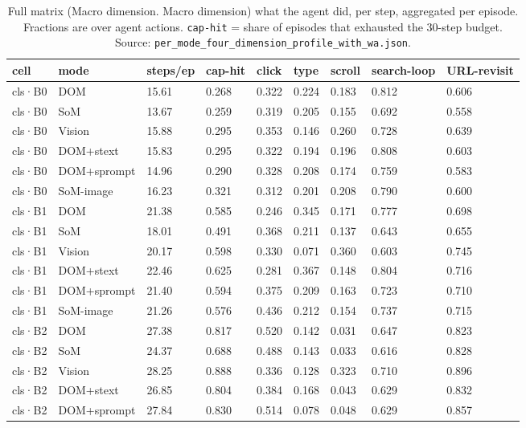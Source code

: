 \begin{table}[tp]
\centering
\caption{Full matrix (Macro dimension. Macro dimension) what the agent did, per step, aggregated per episode. Fractions are over agent actions. \texttt{cap-hit} = share of episodes that exhausted the 30-step budget. Source: \texttt{per\_mode\_four\_dimension\_profile\_with\_wa.json}.}
\label{tab:t07}
\scriptsize
\setlength{\tabcolsep}{3pt}
\begin{tabular}{@{}lllllllll@{}}
\toprule
cell & mode & steps/ep & cap-hit & click & type & scroll & search-loop & URL-revisit \\
\midrule
cls·B0 & DOM & 15.61 & 0.268 & 0.322 & 0.224 & 0.183 & 0.812 & 0.606 \\
cls·B0 & SoM & 13.67 & 0.259 & 0.319 & 0.205 & 0.155 & 0.692 & 0.558 \\
cls·B0 & Vision & 15.88 & 0.295 & 0.353 & 0.146 & 0.260 & 0.728 & 0.639 \\
cls·B0 & DOM+stext & 15.83 & 0.295 & 0.322 & 0.194 & 0.196 & 0.808 & 0.603 \\
cls·B0 & DOM+sprompt & 14.96 & 0.290 & 0.328 & 0.208 & 0.174 & 0.759 & 0.583 \\
cls·B0 & SoM-image & 16.23 & 0.321 & 0.312 & 0.201 & 0.208 & 0.790 & 0.600 \\
cls·B1 & DOM & 21.38 & 0.585 & 0.246 & 0.345 & 0.171 & 0.777 & 0.698 \\
cls·B1 & SoM & 18.01 & 0.491 & 0.368 & 0.211 & 0.137 & 0.643 & 0.655 \\
cls·B1 & Vision & 20.17 & 0.598 & 0.330 & 0.071 & 0.360 & 0.603 & 0.745 \\
cls·B1 & DOM+stext & 22.46 & 0.625 & 0.281 & 0.367 & 0.148 & 0.804 & 0.716 \\
cls·B1 & DOM+sprompt & 21.40 & 0.594 & 0.375 & 0.209 & 0.163 & 0.723 & 0.710 \\
cls·B1 & SoM-image & 21.26 & 0.576 & 0.436 & 0.212 & 0.154 & 0.737 & 0.715 \\
cls·B2 & DOM & 27.38 & 0.817 & 0.520 & 0.142 & 0.031 & 0.647 & 0.823 \\
cls·B2 & SoM & 24.37 & 0.688 & 0.488 & 0.143 & 0.033 & 0.616 & 0.828 \\
cls·B2 & Vision & 28.25 & 0.888 & 0.336 & 0.128 & 0.323 & 0.710 & 0.896 \\
cls·B2 & DOM+stext & 26.85 & 0.804 & 0.384 & 0.168 & 0.043 & 0.629 & 0.832 \\
cls·B2 & DOM+sprompt & 27.84 & 0.830 & 0.514 & 0.078 & 0.048 & 0.629 & 0.857 \\

\end{tabular}
\end{table}
